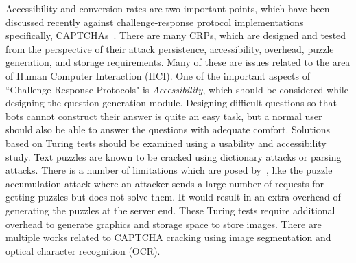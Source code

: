 \documentclass[final,5p,times,twocolumn]{elsarticle}
\begin{document}

\par {Accessibility and conversion rates are two important points, which have been discussed recently against challenge-response protocol implementations specifically, CAPTCHAs~\cite{accessibility}. There are many CRPs, which are designed and tested from the perspective of their attack persistence, accessibility, overhead, puzzle generation, and storage requirements. Many of these are issues related to the area of Human Computer Interaction (HCI). One of the important aspects of ``Challenge-Response Protocols" is {\it Accessibility}, which should be considered while designing the question generation module. Designing difficult questions so that bots cannot construct their answer is quite an easy task, but a normal user should also be able to answer the questions with adequate comfort. Solutions based on Turing tests should be examined using a usability and accessibility study. Text puzzles are known to be cracked using dictionary attacks or parsing attacks. There is a number of limitations which are posed by~\cite{edosshield}, like the puzzle accumulation attack where an attacker sends a large number of requests for getting puzzles but does not solve them. It would result in an extra overhead of generating the puzzles at the server end. These Turing tests require additional overhead to generate graphics and storage space to store images. There are multiple works related to CAPTCHA cracking using image segmentation and optical character recognition (OCR).}
\end{document}
